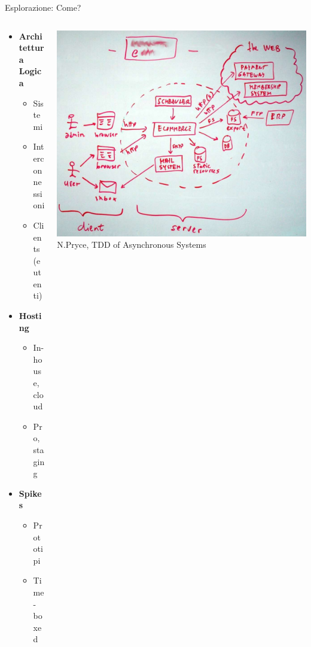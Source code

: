 	\begin{frame}{Esplorazione: Come?}
		
		\begin{columns}[T]

		    \begin{column}{.5\textwidth}
				\begin{itemize}

					\item \textbf{Architettura Logica}
					\begin{itemize}
						\item Sistemi
						\item Interconnessioni
						\item Clients (e utenti)
					\end{itemize}
				
					\item \textbf{Hosting}
					\begin{itemize}
						\item In-house, cloud
						\item Pro, staging
					\end{itemize}
				
					\item \textbf{Spikes}
					\begin{itemize}
						\item Prototipi
						\item Time-boxed
					\end{itemize}
				\end{itemize}
			\end{column}
			
			\begin{column}{.5\textwidth}
				\hspace*{-0.6cm} \includegraphics[scale=0.15]{images/architecture-1} \\
				{\scriptsize N.Pryce, TDD of Asynchronous Systems}
			\end{column}
			

\end{columns}
\end{frame}
